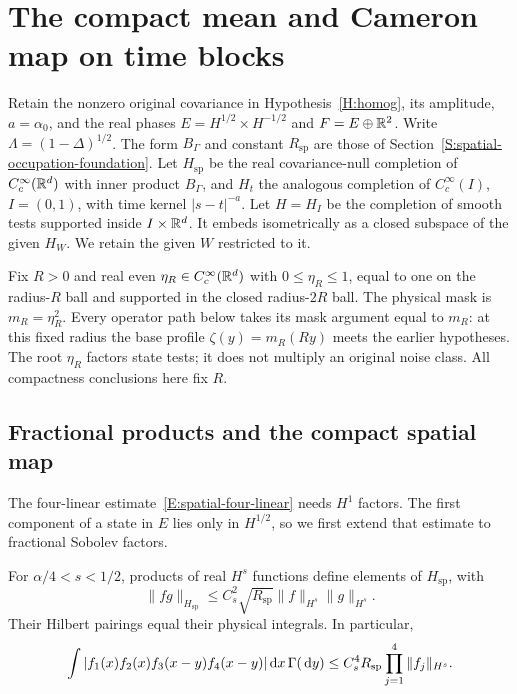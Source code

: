 \section{The compact mean and Cameron map on time blocks}
\label{S:actual-cameron-mean}

Retain the nonzero original covariance in Hypothesis~\ref{H:homog}, its
amplitude, $a = \alpha_0$, and the real phases $E = H^{1/2}\times H^{-1/2}$ and
$F = E\oplus\mathbb{R}^2$. Write $\Lambda = (1-\Delta)^{1/2}$. The form $B_\Gamma$ and
constant $R_{\mathrm{sp}}$ are those of
Section~\ref{S:spatial-occupation-foundation}. Let $H_{\mathrm{sp}}$ be the real
covariance-null completion of $C_c^\infty(\mathbb{R}^d)$ with inner product $B_\Gamma$,
and $H_t$ the analogous completion of $C_c^\infty(I)$, $I = (0,1)$, with time
kernel $|s-t|^{-a}$. Let $H = H_I$ be the completion of smooth tests supported
inside $I\times\mathbb{R}^d$. It embeds isometrically as a closed subspace of the given
$H_W$. We retain the given $W$ restricted to it.

Fix $R > 0$ and real even $\eta_R \in C_c^\infty(\mathbb{R}^d)$ with $0 \le \eta_R \le
1$, equal to one on the radius-$R$ ball and supported in the closed radius-$2R$
ball. The physical mask is $m_R = \eta_R^2$. Every operator path below takes its
mask argument equal to $m_R$: at this fixed radius the base profile $\zeta(y) =
m_R(Ry)$ meets the earlier hypotheses. The root $\eta_R$ factors state tests; it
does not multiply an original noise class. All compactness conclusions here fix
$R$.

\subsection{Fractional products and the compact spatial map}

The four-linear estimate~\eqref{E:spatial-four-linear} needs $H^1$ factors.
The first component of a state in $E$ lies only in $H^{1/2}$, so we first
extend that estimate to fractional Sobolev factors.
%
\begin{lemma}
  \label{L:cameron-fractional-products}
  For $\alpha/4 < s < 1/2$, products of real $H^s$ functions define elements of
  $H_{\mathrm{sp}}$, with
  \begin{equation}\label{E:cameron-fractional-product}
    \|fg\|_{H_{\mathrm{sp}}}
    \le C_s^2\sqrt{R_{\mathrm{sp}}}\|f\|_{H^s}\|g\|_{H^s}.
  \end{equation}
  Their Hilbert pairings equal their physical integrals. In particular,
  \begin{equation}\label{E:cameron-fractional-absolute}
    \int|f_1(x)f_2(x)f_3(x-y)f_4(x-y)|\,\mathrm{d} x\,\Gamma(\,\mathrm{d} y)
    \le C_s^4R_{\mathrm{sp}}\prod_{j=1}^4\|f_j\|_{H^s}.
  \end{equation}
\end{lemma}

